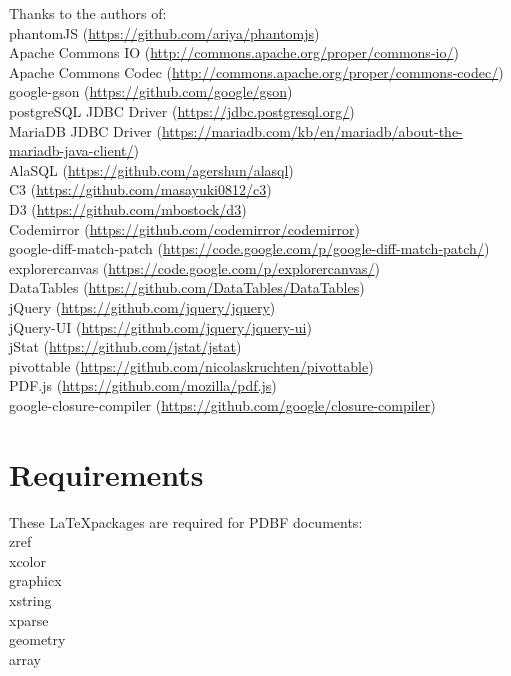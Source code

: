 \documentclass[11pt]{article}
\begin{document}
\newpage
\noindent Thanks to the authors of:\\
phantomJS (\url{https://github.com/ariya/phantomjs})\\
Apache Commons IO (\url{http://commons.apache.org/proper/commons-io/})\\
Apache Commons Codec (\url{http://commons.apache.org/proper/commons-codec/})\\
google-gson (\url{https://github.com/google/gson})\\
postgreSQL JDBC Driver (\url{https://jdbc.postgresql.org/})\\
MariaDB JDBC Driver (\url{https://mariadb.com/kb/en/mariadb/about-the-mariadb-java-client/})\\
AlaSQL (\url{https://github.com/agershun/alasql})\\
C3 (\url{https://github.com/masayuki0812/c3})\\
D3 (\url{https://github.com/mbostock/d3})\\
Codemirror (\url{https://github.com/codemirror/codemirror})\\
google-diff-match-patch (\url{https://code.google.com/p/google-diff-match-patch/})\\
explorercanvas (\url{https://code.google.com/p/explorercanvas/})\\
DataTables (\url{https://github.com/DataTables/DataTables})\\
jQuery (\url{https://github.com/jquery/jquery})\\
jQuery-UI (\url{https://github.com/jquery/jquery-ui})\\
jStat (\url{https://github.com/jstat/jstat})\\
pivottable (\url{https://github.com/nicolaskruchten/pivottable})\\
PDF.js (\url{https://github.com/mozilla/pdf.js})\\
google-closure-compiler (\url{https://github.com/google/closure-compiler})\\
\newpage
\tableofcontents
\newpage

\section{Requirements}
These \LaTeX\relax packages are required for PDBF documents:\\
zref\\
xcolor\\
graphicx\\
xstring\\
xparse\\
geometry\\
array\\
\end{document}
